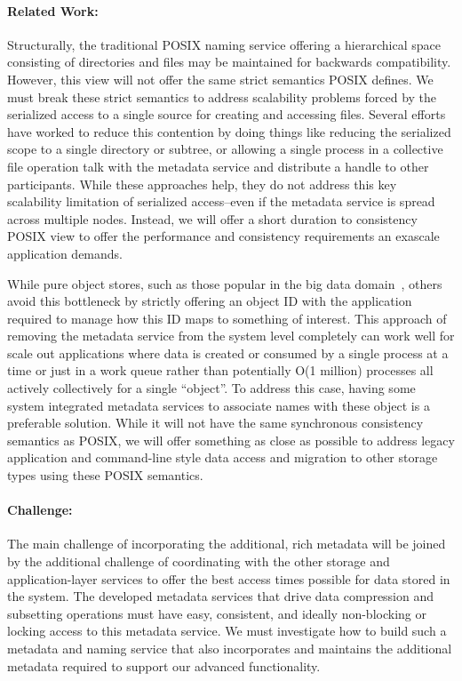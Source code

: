 \paragraph{Related Work:}
Structurally, the traditional POSIX naming service offering a hierarchical
space consisting of directories and files may be maintained for backwards
compatibility. However, this view will not offer the same strict semantics
POSIX defines. We must break these strict semantics to address scalability
problems forced by the serialized access to a single source for creating and
accessing files.  Several efforts~\cite{patil:2007:giga+,carns:pvfs} have
worked to reduce this contention by doing things like reducing the serialized
scope to a single directory or subtree, or allowing a single process in a
collective file operation talk with the metadata service and distribute a
handle to other participants. While these approaches help, they do not address
this key scalability limitation of serialized access--even if the metadata
service is spread across multiple nodes. Instead, we will offer a short
duration to consistency POSIX view to offer the performance and consistency
requirements an exascale application demands.

While pure object stores, such as those popular in the big data
domain~\cite{Fitzpatrick:2004:memcached}, others avoid this bottleneck by
strictly offering an object ID with the application required to manage how this
ID maps to something of interest. This approach of removing the metadata
service from the system level completely can work well for scale out
applications where data is created or consumed by a single process at a time or
just in a work queue rather than potentially O(1 million) processes all
actively collectively for a single ``object''. To address this case, having
some system integrated metadata services to associate names with these object
is a preferable solution. While it will not have the same synchronous
consistency semantics as POSIX, we will offer something as close as possible to
address legacy application and command-line style data access and migration to
other storage types using these POSIX semantics.

\paragraph{Challenge:}
The main challenge of incorporating the additional, rich metadata will be
joined by the additional challenge of coordinating with the other storage and
application-layer services to offer the best access times possible for data
stored in the system. The developed metadata services that drive data
compression and subsetting operations must have easy, consistent, and ideally
non-blocking or locking access to this metadata service. We must investigate
how to build such a metadata and naming service that also incorporates and
maintains the additional metadata required to support our advanced
functionality.

